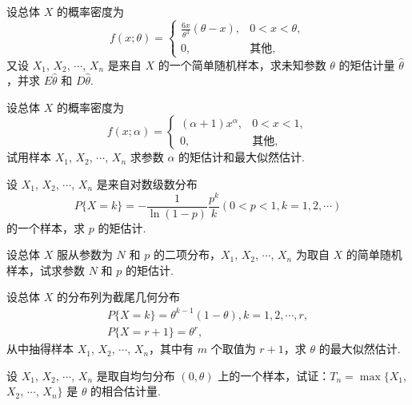 	\begin{titwo}
		设总体 $X$ 的概率密度为
		\[
			f(x;\theta) = \begin{cases}
				\frac{6x}{\theta^{3}} (\theta - x), & 0 < x < \theta, \\
				0, & \text{其他},
			\end{cases}
		\]
		又设 $X_{1}$, $X_{2}$, $\cdots$, $X_{n}$ 是来自 $X$ 的一个简单随机样本，求未知参数 $\theta$ 的矩估计量 $\hat \theta$，并求 $E \hat \theta$ 和 $D \hat \theta$.
	\end{titwo}

	\begin{titwo}
		设总体 $X$ 的概率密度为
		\[
			f(x;\alpha) = \begin{cases}
				(\alpha + 1) x^{\alpha}, & 0 < x < 1, \\
				0, & \text{其他},
			\end{cases}
		\]
		试用样本 $X_{1}$, $X_{2}$, $\cdots$, $X_{n}$ 求参数 $\alpha$ 的矩估计和最大似然估计.
	\end{titwo}

	\begin{titwo}
		设 $X_{1}$, $X_{2}$, $\cdots$, $X_{n}$ 是来自对数级数分布
		\[
			P\{X = k\} = - \frac{1}{\ln(1 - p)} \frac{p^{k}}{k} (0 < p < 1, k = 1,2,\cdots)
		\]
		的一个样本，求 $p$ 的矩估计.
	\end{titwo}

	\begin{titwo}
		设总体 $X$ 服从参数为 $N$ 和 $p$ 的二项分布，$X_{1}$, $X_{2}$, $\cdots$, $X_{n}$ 为取自 $X$ 的简单随机样本，试求参数 $N$ 和 $p$ 的矩估计.
	\end{titwo}

	\begin{titwo}
		设总体 $X$ 的分布列为截尾几何分布
		\begin{gather*}
			P\{X = k\} = \theta^{k-1} (1 - \theta), k = 1,2,\cdots,r, \\
			P\{X = r + 1\} = \theta^{r},
		\end{gather*}
		从中抽得样本 $X_{1}$, $X_{2}$, $\cdots$, $X_{n}$，其中有 $m$ 个取值为 $r+1$，求 $\theta$ 的最大似然估计.
	\end{titwo}

	\begin{titwo}
		设 $X_{1}$, $X_{2}$, $\cdots$, $X_{n}$ 是取自均匀分布 $(0,\theta)$ 上的一个样本，试证：$T_{n} = \max\{ X_{1}$, $X_{2}$, $\cdots$, $X_{n} \}$ 是 $\theta$ 的相合估计量.
	\end{titwo}

